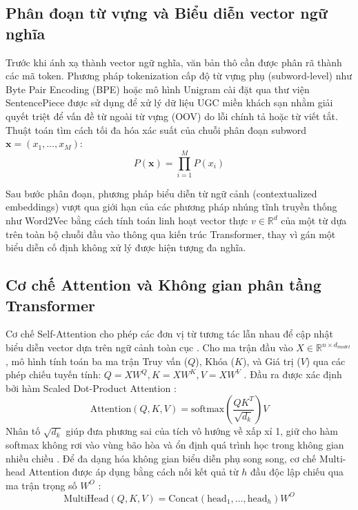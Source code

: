 \subsection{Phân đoạn từ vựng và Biểu diễn vector ngữ nghĩa}
\label{subsec:dev-chap2-embedding-tokenization}

Trước khi ánh xạ thành vector ngữ nghĩa, văn bản thô cần được phân rã thành các mã token. Phương pháp tokenization cấp độ từ vựng phụ (subword-level) như Byte Pair Encoding (BPE) \cite{sennrich2016neural} hoặc mô hình Unigram cài đặt qua thư viện SentencePiece \cite{kudo2018sentencepiece} được sử dụng để xử lý dữ liệu UGC miền khách sạn nhằm giải quyết triệt để vấn đề từ ngoài từ vựng (OOV) do lỗi chính tả hoặc từ viết tắt. Thuật toán tìm cách tối đa hóa xác suất của chuỗi phân đoạn subword $\mathbf{x} = (x_1, \dots, x_M)$:
\begin{equation}
P(\mathbf{x}) = \prod_{i=1}^{M} P(x_i)
\label{eq:dev-chap2-unigram-prob}
\end{equation}

Sau bước phân đoạn, phương pháp biểu diễn từ ngữ cảnh (contextualized embeddings) vượt qua giới hạn của các phương pháp nhúng tĩnh truyền thống như Word2Vec \cite{mikolov2013efficient} bằng cách tính toán linh hoạt vector thực $v \in \mathbb{R}^d$ của một từ dựa trên toàn bộ chuỗi đầu vào thông qua kiến trúc Transformer, thay vì gán một biểu diễn cố định không xử lý được hiện tượng đa nghĩa.

\subsection{Cơ chế Attention và Không gian phân tầng Transformer}
\label{subsec:dev-chap2-attention-architecture}

Cơ chế Self-Attention cho phép các đơn vị từ tương tác lẫn nhau để cập nhật biểu diễn vector dựa trên ngữ cảnh toàn cục \cite{vaswani2017attention}. Cho ma trận đầu vào $X \in \mathbb{R}^{n \times d_{model}}$, mô hình tính toán ba ma trận Truy vấn ($Q$), Khóa ($K$), và Giá trị ($V$) qua các phép chiếu tuyến tính: $Q = XW^Q, K = XW^K, V = XW^V$ \cite{vaswani2017attention}. Đầu ra được xác định bởi hàm Scaled Dot-Product Attention \cite{vaswani2017attention}:
\begin{equation}
\text{Attention}(Q, K, V) = \text{softmax}\left(\frac{QK^T}{\sqrt{d_k}}\right)V
\label{eq:dev-chap2-attention}
\end{equation}
Nhân tố $\sqrt{d_k}$ giúp đưa phương sai của tích vô hướng về xấp xỉ 1, giữ cho hàm softmax không rơi vào vùng bão hòa và ổn định quá trình học trong không gian nhiều chiều \cite{vaswani2017attention}. Để đa dạng hóa không gian biểu diễn phụ song song, cơ chế Multi-head Attention được áp dụng bằng cách nối kết quả từ $h$ đầu độc lập chiếu qua ma trận trọng số $W^O$ \cite{vaswani2017attention}:
\begin{equation}
\text{MultiHead}(Q, K, V) = \text{Concat}(\text{head}_1, \dots, \text{head}_h)W^O
\label{eq:dev-chap2-multihead}
\end{equation}

